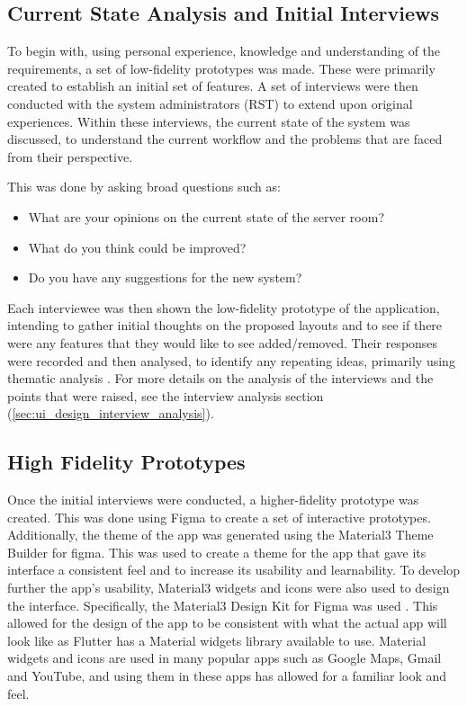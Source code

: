 \documentclass [11pt,a4paper]{article}
\begin{document}
\subsection{Current State Analysis and Initial Interviews}
\label{sec:current_state_analysis}

To begin with, using personal experience, knowledge and understanding of the requirements, a set of low-fidelity prototypes was made. These were primarily created to establish an initial set of features. A set of interviews were then conducted with the system administrators (RST) to extend upon original experiences.  Within these interviews, the current state of the system was discussed, to understand the current workflow and the problems that are faced from their perspective.

This was done by asking broad questions such as:

\begin{itemize}
    \item What are your opinions on the current state of the server room?
    \item What do you think could be improved?
    \item Do you have any suggestions for the new system?
\end{itemize}

Each interviewee was then shown the low-fidelity prototype of the application, intending to gather initial thoughts on the proposed layouts and to see if there were any features that they would like to see added/removed. Their responses were recorded and then analysed, to identify any repeating ideas, primarily using thematic analysis \cite{thematicAnal}. For more details on the analysis of the interviews and the points that were raised, see the interview analysis section (\ref{sec:ui_design_interview_analysis}).

\subsection{High Fidelity Prototypes}
\label{sec:high_fidelity_prototypes}
Once the initial interviews were conducted, a higher-fidelity prototype was created. This was done using Figma to create a set of interactive prototypes. Additionally, the theme of the app was generated using the Material3 Theme Builder for figma\cite{material3ColourTool}. This was used to create a theme for the app that gave its interface a consistent feel and to increase its usability and learnability. To develop further the app's usability, Material3 widgets and icons were also used to design the interface. Specifically, the Material3 Design Kit for Figma was used \cite{material3DesignKit}. This allowed for the design of the app to be consistent with what the actual app will look like as Flutter has a Material widgets library available to use. Material widgets and icons are used in many popular apps such as Google Maps, Gmail and YouTube, and using them in these apps has allowed for a familiar look and feel. 
\end{document}
